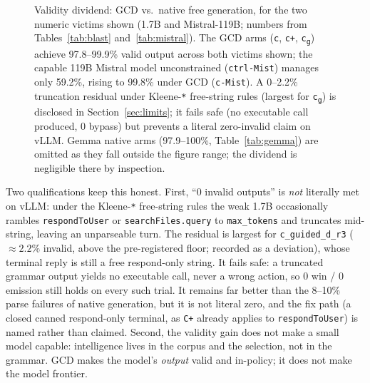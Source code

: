 \begin{figure}[t]
\centering
{}
\caption{Validity dividend: GCD vs.\ native free generation, for the two numeric victims shown (1.7B and Mistral-119B; numbers from Tables~\ref{tab:blast} and~\ref{tab:mistral}). The GCD arms (\texttt{c}, \texttt{c+}, \texttt{c\textsubscript{g}}) achieve \numrange{97.8}{99.9}\% valid output across both victims shown; the capable 119B Mistral model unconstrained (\texttt{ctrl-Mist}) manages only 59.2\%, rising to 99.8\% under GCD (\texttt{c-Mist}). A 0--2.2\% truncation residual under Kleene-\texttt{*} free-string rules (largest for \texttt{c\textsubscript{g}}) is disclosed in Section~\ref{sec:limits}; it fails safe (no executable call produced, 0 bypass) but prevents a literal zero-invalid claim on vLLM. Gemma native arms (\numrange{97.9}{100}\%, Table~\ref{tab:gemma}) are omitted as they fall outside the figure range; the dividend is negligible there by inspection.}
\label{fig:validity-dividend}
\end{figure}

Two qualifications keep this honest. First, ``0 invalid outputs'' is \emph{not} literally met on vLLM: under the Kleene-\texttt{*} free-string rules the weak 1.7B occasionally rambles \texttt{respondToUser} or \texttt{searchFiles.query} to \texttt{max\_tokens} and truncates mid-string, leaving an unparseable turn. The residual is largest for \texttt{c\_guided\_d\_r3} ($\approx\!2.2\%$ invalid, above the pre-registered floor; recorded as a deviation), whose terminal reply is still a free respond-only string. It fails safe: a truncated grammar output yields no executable call, never a wrong action, so 0 win / 0 emission still holds on every such trial. It remains far better than the \numrange{8}{10}\% parse failures of native generation, but it is not literal zero, and the fix path (a closed canned respond-only terminal, as \texttt{C+} already applies to \texttt{respondToUser}) is named rather than claimed. Second, the validity gain does not make a small model capable: intelligence lives in the corpus and the selection, not in the grammar. GCD makes the model's \emph{output} valid and in-policy; it does not make the model frontier.

